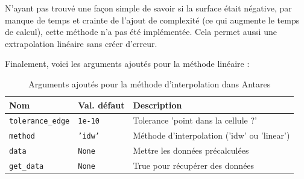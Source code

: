 N'ayant pas trouvé une façon simple de savoir si la surface était négative, par manque de temps et crainte de l'ajout de complexité (ce qui augmente le temps de calcul), cette méthode n'a pas été implémentée.
Cela permet aussi une extrapolation linéaire sans créer d'erreur.


Finalement, voici les arguments ajoutés pour la méthode linéaire :

\label{arguments_ajoutes}
\begin{table}[ht]
    \centering
    \begin{tabular}{|l|l|l|}
    \hline
    \textbf{Nom} & \textbf{Val. défaut} & \textbf{Description} \\ \hline %

    \texttt{tolerance\_edge} & \texttt{1e-10} & Tolerance 'point dans la cellule ?' \\
    \texttt{method} & \texttt{'idw'} & Méthode d'interpolation ('idw' ou 'linear') \\
    \texttt{data} & \texttt{None} & Mettre les données précalculées \\
    \texttt{get\_data} & \texttt{None} & True pour récupérer des données \\ \hline
    \end{tabular}
    \caption{Arguments ajoutés pour la méthode d'interpolation dans Antares}
    \label{tab:arguments_interpolation2}
\end{table}

